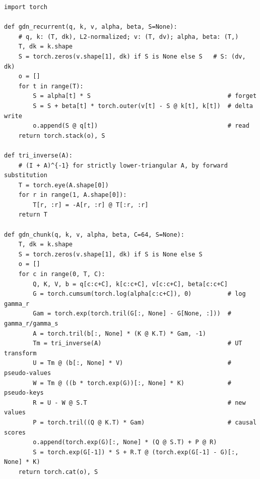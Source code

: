 \begin{lstlisting}[caption={Reference implementation (ours): Gated DeltaNet, recurrent and chunkwise},label={lst:c05-ours-gdn}]
import torch

def gdn_recurrent(q, k, v, alpha, beta, S=None):
    # q, k: (T, dk), L2-normalized; v: (T, dv); alpha, beta: (T,)
    T, dk = k.shape
    S = torch.zeros(v.shape[1], dk) if S is None else S   # S: (dv, dk)
    o = []
    for t in range(T):
        S = alpha[t] * S                                      # forget
        S = S + beta[t] * torch.outer(v[t] - S @ k[t], k[t])  # delta write
        o.append(S @ q[t])                                    # read
    return torch.stack(o), S

def tri_inverse(A):
    # (I + A)^{-1} for strictly lower-triangular A, by forward substitution
    T = torch.eye(A.shape[0])
    for r in range(1, A.shape[0]):
        T[r, :r] = -A[r, :r] @ T[:r, :r]
    return T

def gdn_chunk(q, k, v, alpha, beta, C=64, S=None):
    T, dk = k.shape
    S = torch.zeros(v.shape[1], dk) if S is None else S
    o = []
    for c in range(0, T, C):
        Q, K, V, b = q[c:c+C], k[c:c+C], v[c:c+C], beta[c:c+C]
        G = torch.cumsum(torch.log(alpha[c:c+C]), 0)          # log gamma_r
        Gam = torch.exp(torch.tril(G[:, None] - G[None, :]))  # gamma_r/gamma_s
        A = torch.tril(b[:, None] * (K @ K.T) * Gam, -1)
        Tm = tri_inverse(A)                                   # UT transform
        U = Tm @ (b[:, None] * V)                             # pseudo-values
        W = Tm @ ((b * torch.exp(G))[:, None] * K)            # pseudo-keys
        R = U - W @ S.T                                       # new values
        P = torch.tril((Q @ K.T) * Gam)                       # causal scores
        o.append(torch.exp(G)[:, None] * (Q @ S.T) + P @ R)
        S = torch.exp(G[-1]) * S + R.T @ (torch.exp(G[-1] - G)[:, None] * K)
    return torch.cat(o), S
\end{lstlisting}

